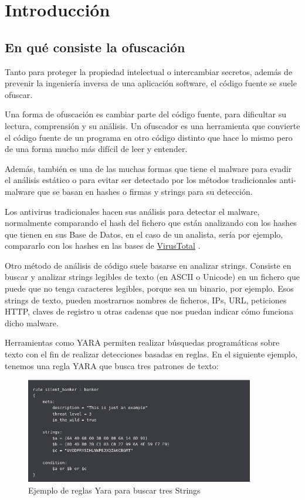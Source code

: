 \documentclass[15pt]{article}
\begin{document}
	\newpage
	\tableofcontents
	\newpage
	
	\section{Introducción}
	\subsection{En qué consiste la ofuscación}
	Tanto para proteger la propiedad intelectual o intercambiar secretos, además de prevenir la ingeniería inversa de una aplicación software, el código fuente se suele ofuscar.
	
	Una forma de ofuscación es cambiar parte del código fuente, para dificultar su lectura, comprensión y su análisis. Un ofuscador es una herramienta que convierte el código fuente de un programa en otro código distinto que hace lo mismo pero de una forma mucho más difícil de leer y entender.
	
	Además, también es una de las muchas formas que tiene el malware para evadir el análisis estático o para evitar ser detectado por los métodos tradicionales anti-malware que se basan en hashes o firmas y strings para su detección.
	
	Los antivirus tradicionales hacen sus análisis para detectar el malware, normalmente comparando el hash del fichero que están analizando con los hashes que tienen en sus Base de Datos, en el caso de un analista, sería por ejemplo, compararlo con los hashes en las bases de \href{https://www.virustotal.com/gui/}{VirusTotal} \cite{virustotal}. 
	
	Otro método de análisis de código suele basarse en analizar strings. Consiste en buscar y analizar strings legibles de texto (en ASCII o Unicode) en un fichero que puede que no tenga caracteres legibles, porque sea un binario, por ejemplo. Esos strings de texto, pueden mostrarnos nombres de ficheros, IPs, URL, peticiones HTTP, claves de registro u otras cadenas que nos puedan indicar cómo funciona dicho malware. 
	
	Herramientas como YARA permiten realizar búsquedas programáticas sobre texto con el fin de realizar detecciones basadas en reglas. En el siguiente ejemplo, tenemos una regla YARA que busca tres patrones de texto\cite{yara}:
	
	\begin{figure}[h]
		\centering
		\includegraphics[width=10cm]{images/yara.png}
		\caption{Ejemplo de reglas Yara para buscar tres Strings}
	\end{figure}
	
\end{document}
